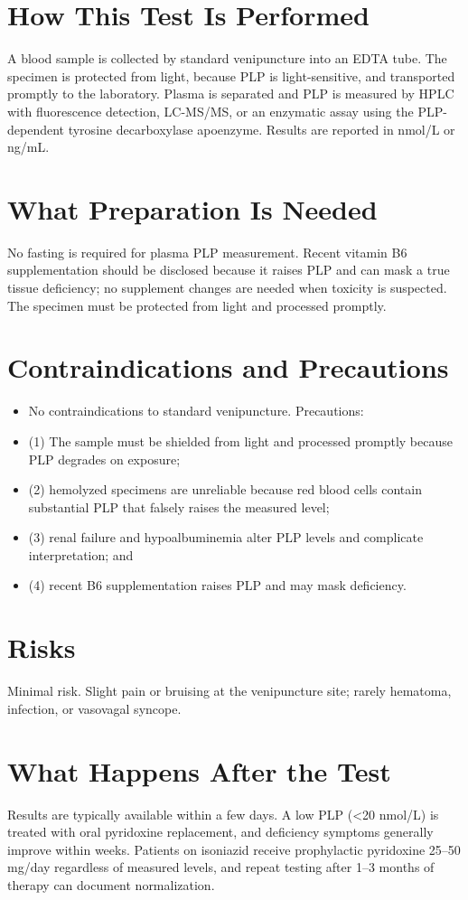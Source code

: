 \section*{How This Test Is Performed}
A blood sample is collected by standard venipuncture into an EDTA tube. The specimen is protected from light, because PLP is light-sensitive, and transported promptly to the laboratory. Plasma is separated and PLP is measured by HPLC with fluorescence detection, LC-MS/MS, or an enzymatic assay using the PLP-dependent tyrosine decarboxylase apoenzyme. Results are reported in nmol/L or ng/mL.
\section*{What Preparation Is Needed}
No fasting is required for plasma PLP measurement. Recent vitamin B6 supplementation should be disclosed because it raises PLP and can mask a true tissue deficiency; no supplement changes are needed when toxicity is suspected. The specimen must be protected from light and processed promptly.
\section*{Contraindications and Precautions}
\begin{itemize}
  \item No contraindications to standard venipuncture. Precautions:
  \item (1) The sample must be shielded from light and processed promptly because PLP degrades on exposure;
  \item (2) hemolyzed specimens are unreliable because red blood cells contain substantial PLP that falsely raises the measured level;
  \item (3) renal failure and hypoalbuminemia alter PLP levels and complicate interpretation; and
  \item (4) recent B6 supplementation raises PLP and may mask deficiency.
\end{itemize}
\section*{Risks}
Minimal risk. Slight pain or bruising at the venipuncture site; rarely hematoma, infection, or vasovagal syncope.
\section*{What Happens After the Test}
Results are typically available within a few days. A low PLP (<20 nmol/L) is treated with oral pyridoxine replacement, and deficiency symptoms generally improve within weeks. Patients on isoniazid receive prophylactic pyridoxine 25--50 mg/day regardless of measured levels, and repeat testing after 1--3 months of therapy can document normalization.
